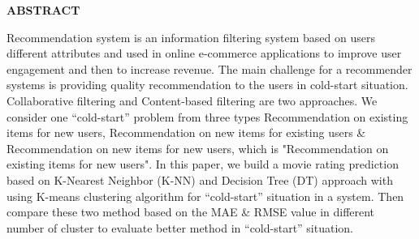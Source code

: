 \documentclass[document.tex]{subfiles}
\begin{document}
\begin{center}
        \textbf{{\fontsize{16pt}{1.5cm}\selectfont ABSTRACT}}
        \vspace{1cm}
\end{center}

\noindent Recommendation system is an information filtering system based on users different attributes and used in online e-commerce applications to improve user engagement and then to increase revenue. The main challenge for a recommender systems is providing quality recommendation to the users in cold-start situation. Collaborative filtering and Content-based filtering are two approaches. We consider one “cold-start” problem from three types Recommendation on existing items for new users, Recommendation on new items for existing users \& Recommendation on new items for new users, which is "Recommendation on existing items for new users". In this paper, we build a movie rating prediction based on K-Nearest Neighbor (K-NN) and Decision Tree (DT) approach with using K-means clustering algorithm for “cold-start” situation in a system. Then compare these two method based on the MAE \& RMSE value in different number of cluster to evaluate better method in “cold-start” situation.

\clearpage
\end{document}

